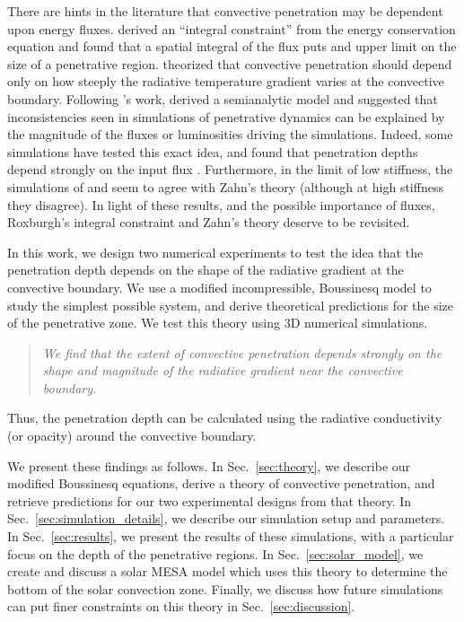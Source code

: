 \documentclass{aastex631}
\begin{document}
There are hints in the literature that convective penetration may be dependent upon energy fluxes.
\citet{roxburgh1978, roxburgh1989, roxburgh1992, roxburgh1998} derived an ``integral constraint'' from the energy conservation equation and found that a spatial integral of the flux puts and upper limit on the size of a penetrative region.
\citet{zahn1991} theorized that convective penetration should depend only on how steeply the radiative temperature gradient varies at the convective boundary.
Following \citet{zahn1991}'s work, \citet{rempel2004} derived a semianalytic model and suggested that inconsistencies seen in simulations of penetrative dynamics can be explained by the magnitude of the fluxes or luminosities driving the simulations.
Indeed, some simulations have tested this exact idea, and found that penetration depths depend strongly on the input flux \citep{singh_etal_1998, kapyla_etal_2007, tian_etal_2009, hotta2017, kapyla2019}.
Furthermore, in the limit of low stiffness, the simulations of \citet{hurlburt_etal_1994} and \citet{rogers_etal_2006} seem to agree with Zahn's theory (although at high stiffness they disagree).
In light of these results, and the possible importance of fluxes, Roxburgh's integral constraint and Zahn's theory deserve to be revisited.

In this work, we design two numerical experiments to test the idea that the penetration depth depends on the shape of the radiative gradient at the convective boundary.
We use a modified incompressible, Boussinesq model to study the simplest possible system, and derive theoretical predictions for the size of the penetrative zone.
We test this theory using 3D numerical simulations.
\begin{quote}
\emph{
We find that the extent of convective penetration depends strongly on the shape and magnitude of the radiative gradient near the convective boundary.
}
\end{quote}
Thus, the penetration depth can be calculated using the radiative conductivity (or opacity) around the convective boundary.

We present these findings as follows.
In Sec.~\ref{sec:theory}, we describe our modified Boussinesq equations, derive a theory of convective penetration, and retrieve predictions for our two experimental designs from that theory.
In Sec.~\ref{sec:simulation_details}, we describe our simulation setup and parameters.
In Sec.~\ref{sec:results}, we present the results of these simulations, with a particular focus on the depth of the penetrative regions.
In Sec.~\ref{sec:solar_model}, we create and discuss a solar MESA model which uses this theory to determine the bottom of the solar convection zone.
Finally, we discuss how future simulations can put finer constraints on this theory in Sec.~\ref{sec:discussion}.
\end{document}
